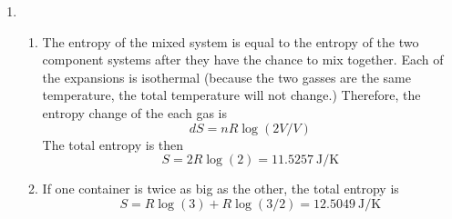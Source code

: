 \documentclass[fleqn]{article}[12pt]
\begin{document}
\begin{enumerate}
    \item \begin{enumerate}
        \item The entropy of the mixed system is equal to the entropy of the two component systems after they have the chance to mix together. Each of the expansions is isothermal (because the two gasses are the same temperature, the total temperature will not change.) Therefore, the entropy change of the each gas is
        \begin{equation*}
            dS = nR\log(2V/V)
        \end{equation*}
        The total entropy is then
        \begin{equation*}
            S = 2R\log(2) = \SI{11.5257}{\joule/\kelvin}
        \end{equation*}
        \item If one container is twice as big as the other, the total entropy is
        \begin{equation*}
            S = R\log(3) + R\log(3/2) = \SI{12.5049}{\joule/\kelvin}
        \end{equation*}
    \end{enumerate}
\end{enumerate}
\end{document}
